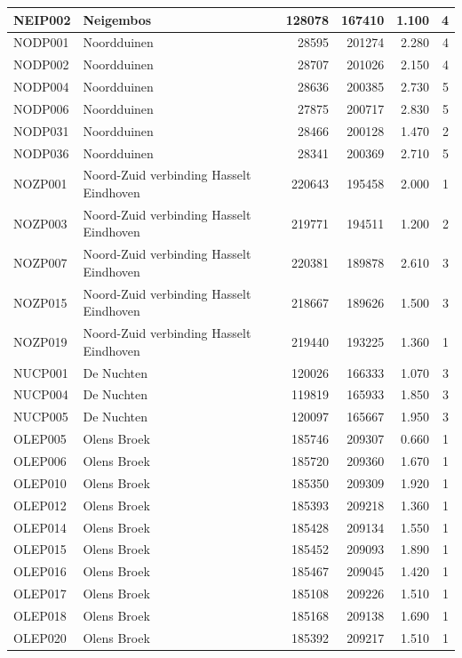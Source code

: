 \documentclass[11pt,]{book}
\begin{document}
\begin{table}
\begin{tabular}[t]{l|l|r|r|r|r}
\hline
NEIP002 & Neigembos & 128078 & 167410 & 1.100 & 4\\
\hline
NODP001 & Noordduinen & 28595 & 201274 & 2.280 & 4\\
\hline
NODP002 & Noordduinen & 28707 & 201026 & 2.150 & 4\\
\hline
NODP004 & Noordduinen & 28636 & 200385 & 2.730 & 5\\
\hline
NODP006 & Noordduinen & 27875 & 200717 & 2.830 & 5\\
\hline
NODP031 & Noordduinen & 28466 & 200128 & 1.470 & 2\\
\hline
NODP036 & Noordduinen & 28341 & 200369 & 2.710 & 5\\
\hline
NOZP001 & Noord-Zuid verbinding Hasselt Eindhoven & 220643 & 195458 & 2.000 & 1\\
\hline
NOZP003 & Noord-Zuid verbinding Hasselt Eindhoven & 219771 & 194511 & 1.200 & 2\\
\hline
NOZP007 & Noord-Zuid verbinding Hasselt Eindhoven & 220381 & 189878 & 2.610 & 3\\
\hline
NOZP015 & Noord-Zuid verbinding Hasselt Eindhoven & 218667 & 189626 & 1.500 & 3\\
\hline
NOZP019 & Noord-Zuid verbinding Hasselt Eindhoven & 219440 & 193225 & 1.360 & 1\\
\hline
NUCP001 & De Nuchten & 120026 & 166333 & 1.070 & 3\\
\hline
NUCP004 & De Nuchten & 119819 & 165933 & 1.850 & 3\\
\hline
NUCP005 & De Nuchten & 120097 & 165667 & 1.950 & 3\\
\hline
OLEP005 & Olens Broek & 185746 & 209307 & 0.660 & 1\\
\hline
OLEP006 & Olens Broek & 185720 & 209360 & 1.670 & 1\\
\hline
OLEP010 & Olens Broek & 185350 & 209309 & 1.920 & 1\\
\hline
OLEP012 & Olens Broek & 185393 & 209218 & 1.360 & 1\\
\hline
OLEP014 & Olens Broek & 185428 & 209134 & 1.550 & 1\\
\hline
OLEP015 & Olens Broek & 185452 & 209093 & 1.890 & 1\\
\hline
OLEP016 & Olens Broek & 185467 & 209045 & 1.420 & 1\\
\hline
OLEP017 & Olens Broek & 185108 & 209226 & 1.510 & 1\\
\hline
OLEP018 & Olens Broek & 185168 & 209138 & 1.690 & 1\\
\hline
OLEP020 & Olens Broek & 185392 & 209217 & 1.510 & 1\\

\end{tabular}
\end{table}
\end{document}
